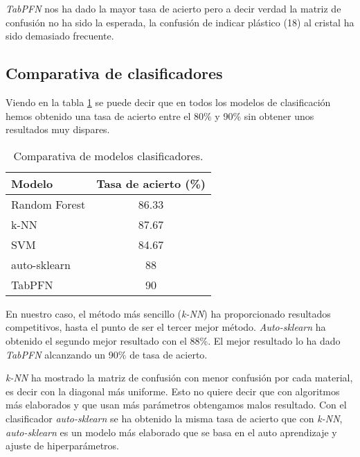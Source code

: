 \textit{TabPFN} nos ha dado la mayor tasa de acierto pero a decir verdad la matriz de confusión no ha sido la esperada, la confusión de indicar plástico (18) al cristal ha sido demasiado frecuente.
\clearpage

\subsection{Comparativa de clasificadores}

Viendo en la tabla \ref{tab:comparativa} se puede decir que en todos los modelos de clasificación hemos obtenido una tasa de acierto entre el 80\% y 90\% sin obtener unos resultados muy dispares.

\begin{table}[h]
\begin{center}
\begin{tabular}{|l|c|}
\hline
\rowcolor[gray]{0.9} 
\textbf{Modelo} & \textbf{Tasa de acierto (\%)} \\ \hline
Random Forest   & 86.33                         \\ \hline
\rowcolor[gray]{0.9} 
k-NN            & 87.67                         \\ \hline
SVM             & 84.67                         \\ \hline
\rowcolor[gray]{0.9} 
auto-sklearn    & 88                            \\ \hline
TabPFN          & 90                            \\ \hline
\end{tabular}
\caption{Comparativa de modelos clasificadores.}
\label{tab:comparativa}
\end{center}
\end{table}

En nuestro caso, el método más sencillo (\textit{k-NN}) ha proporcionado resultados competitivos, hasta el punto de ser el tercer mejor método. \textit{Auto-sklearn} ha obtenido el segundo mejor resultado con el 88\%. El mejor resultado lo ha dado \textit{TabPFN} alcanzando un 90\% de tasa de acierto.

\textit{k-NN} ha mostrado la matriz de confusión con menor confusión por cada material, es decir con la diagonal más uniforme. Esto no quiere decir que con algoritmos más elaborados y que usan más parámetros obtengamos malos resultado. Con el clasificador \textit{auto-sklearn} se ha obtenido la misma tasa de acierto que con \textit{k-NN}, \textit{auto-sklearn} es un modelo más elaborado que se basa en el auto aprendizaje y ajuste de hiperparámetros.

